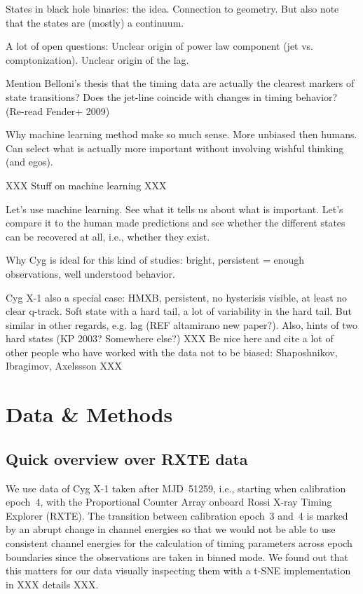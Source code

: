 \documentclass{aa}
\begin{document}
States in black hole binaries: the idea. Connection to geometry. But
also note that the states are (mostly) a continuum.

A lot of open questions: Unclear origin of power law component (jet
vs. comptonization). Unclear origin of the lag.

Mention Belloni's thesis that the timing data are actually the
clearest markers of state transitions? Does the jet-line coincide with
changes in timing behavior? (Re-read Fender+ 2009)



Why machine learning method make so much sense. More unbiased then
humans. Can select what is actually more important without involving
wishful thinking (and egos).

XXX Stuff on machine learning XXX

Let's use machine learning. See what it tells us about what is
important. Let's compare it to the human made predictions and see
whether the different states can be recovered at all, i.e., whether
they exist.

Why Cyg is ideal for this kind of studies: bright, persistent = enough
observations, well understood behavior.

Cyg X-1 also a special case: HMXB, persistent, no hysterisis visible,
at least no clear q-track. Soft state with a hard tail, a lot of
variability in the hard tail. But similar in other regards, e.g. lag
(REF altamirano new paper?). Also, hints of two hard states (KP 2003?
Somewhere else?) XXX Be nice here and cite a lot of other people who
have worked with the data not to be biased: Shaposhnikov, Ibragimov,
Axelssson XXX

\section{Data \& Methods}

\subsection{Quick overview over RXTE data}

We use data of Cyg X-1 taken after MJD~51259, i.e., starting when
calibration epoch~4, with the Proportional Counter Array
\citep[PCA;][]{Jahoda_2006a} onboard Rossi X-ray Timing Explorer
(RXTE). The transition between calibration epoch~3 and~4 is marked by
an abrupt change in channel energies \citep[see e.g.][]{Garcia_2014a}
so that we would not be able to use consistent channel energies for
the calculation of timing parameters across epoch boundaries since the
observations are taken in binned mode. We found out that this matters
for our data visually inspecting them with a
t-SNE\citep{van_der_Maaten_2008a} implementation in XXX details XXX.
\end{document}
